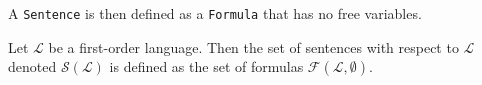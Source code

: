 A \texttt{Sentence} is then defined as a \texttt{Formula} that has no free variables.

\begin{definition}[Formula]\label{def:formula}
    \leanok
    Let $\mathcal{L}$ be a first-order language. Then the set of sentences with respect to $\mathcal{L}$ denoted $\mathcal{S}(\mathcal{L})$ is defined as the set of formulas $\mathcal{F}(\mathcal{L},\emptyset)$.
\end{definition}






